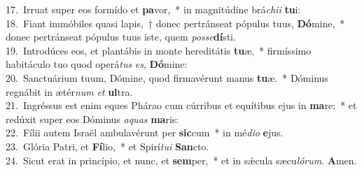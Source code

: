 {17.~}Irruat super eos formído et \textbf{pa}vor,~* in magnitúdine brá\textit{chi}\textit{i} \textbf{tu}i:\\
{18.~}Fiant immóbiles quasi lapis,~† donec pertránseat pópulus tuus, \textbf{Dó}mine,~* donec pertránseat pópulus tuus iste, quem \textit{pos}\textit{se}\textbf{dí}sti.\\
{19.~}Introdúces eos, et plantábis in monte hereditátis \textbf{tu}æ,~* firmíssimo habitáculo tuo quod operá\textit{tus} \textit{es}, \textbf{Dó}mine:\\
{20.~}Sanctuárium tuum, Dómine, quod firmavérunt manus \textbf{tu}æ.~* Dóminus regnábit in ætér\textit{num} \textit{et} \textbf{ul}tra.\\
{21.~}Ingréssus est enim eques Phárao cum cúrribus et equítibus ejus in \textbf{ma}re:~* et redúxit super eos Dóminus \textit{a}\textit{quas} \textbf{ma}ris:\\
{22.~}Fílii autem Israël ambulavérunt per \textbf{sic}cum~* in mé\textit{di}\textit{o} \textbf{e}jus.\\
{23.~}Glória Patri, et \textbf{Fí}lio,~* et Spirí\textit{tu}\textit{i} \textbf{San}cto.\\
{24.~}Sicut erat in princípio, et nunc, et \textbf{sem}per,~* et in sǽcula sæcu\textit{ló}\textit{rum}. \textbf{A}men.\\
